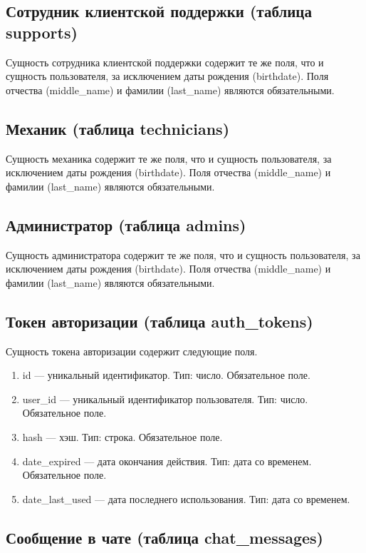 \subsection{Сотрудник клиентской поддержки (таблица supports)}

Сущность сотрудника клиентской поддержки содержит те же поля, что и сущность пользователя, за исключением даты рождения (birthdate). Поля отчества (middle\_name) и фамилии (last\_name) являются обязательными.

\subsection{Механик (таблица technicians)}

Сущность механика содержит те же поля, что и сущность пользователя, за исключением даты рождения (birthdate). Поля отчества (middle\_name) и фамилии (last\_name) являются обязательными.

\subsection{Администратор (таблица admins)}

Сущность администратора содержит те же поля, что и сущность пользователя, за исключением даты рождения (birthdate). Поля отчества (middle\_name) и фамилии (last\_name) являются обязательными.

\subsection{Токен авторизации (таблица auth\_tokens)}

Сущность токена авторизации содержит следующие поля.

\begin{enumerate}
    \item id --- уникальный идентификатор. Тип: число. Обязательное поле.
    \item user\_id --- уникальный идентификатор пользователя. Тип: число. Обязательное поле.
    \item hash --- хэш. Тип: строка. Обязательное поле.
    \item date\_expired --- дата окончания действия. Тип: дата со временем. Обязательное поле.
    \item date\_last\_used --- дата последнего использования. Тип: дата со временем.
\end{enumerate}

\subsection{Сообщение в чате (таблица chat\_messages)}

